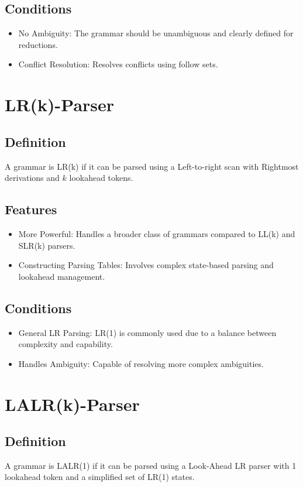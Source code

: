 \subsection{Conditions}
\begin{itemize}
    \item No Ambiguity: The grammar should be unambiguous and clearly defined for reductions.
    \item Conflict Resolution: Resolves conflicts using follow sets.
\end{itemize}

\section{LR(k)-Parser}

\subsection{Definition}
A grammar is LR(k) if it can be parsed using a Left-to-right scan with Rightmost derivations and \( k \) lookahead tokens.

\subsection{Features}
\begin{itemize}
    \item More Powerful: Handles a broader class of grammars compared to LL(k) and SLR(k) parsers.
    \item Constructing Parsing Tables: Involves complex state-based parsing and lookahead management.
\end{itemize}

\subsection{Conditions}
\begin{itemize}
    \item General LR Parsing: LR(1) is commonly used due to a balance between complexity and capability.
    \item Handles Ambiguity: Capable of resolving more complex ambiguities.
\end{itemize}

\section{LALR(k)-Parser}

\subsection{Definition}
A grammar is LALR(1) if it can be parsed using a Look-Ahead LR parser with 1 lookahead token and a simplified set of LR(1) states.

